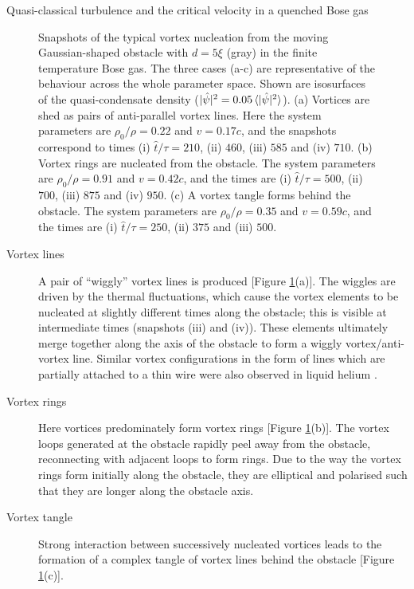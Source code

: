 \begin{chapter}{\label{cha:nonequib}Quasi-classical turbulence and the critical velocity in a quenched Bose gas}
\begin{figure}
    \caption{\label{fig:vort-lines} Snapshots of the typical vortex nucleation from the moving Gaussian-shaped obstacle with $d=5\xi$ (gray) in the finite temperature Bose gas. The three cases (a-c) are representative of the behaviour across the whole parameter space. Shown are  isosurfaces of the quasi-condensate density ($|\hat{\psi}|^2 = 0.05\braket{|\hat{\psi}|^2}$).  (a) Vortices are shed as pairs of anti-parallel vortex lines.  Here the system parameters are $\rho_0/\rho = 0.22$ and $v=0.17c$, and the snapshots correspond to times (i) $\hat{t}/\tau=210$, (ii) $460$, (iii) $585$ and (iv) $710$.  (b) Vortex rings are nucleated from the obstacle.  The system parameters are $\rho_0/\rho = 0.91$ and $v=0.42c$, and the times are (i) $\hat{t}/\tau=500$, (ii) $700$, (iii) $875$ and (iv) $950$. (c) A vortex tangle forms behind the obstacle. The system parameters are $\rho_0/\rho = 0.35$ and $v=0.59c$, and the times are (i) $\hat{t}/\tau=250$, (ii) $375$ and (iii) $500$. }
\end{figure}


\begin{description}
\item[Vortex lines] A pair of ``wiggly'' vortex lines is produced  [Figure  \ref{fig:vort-lines}(a)].  The wiggles are driven by the thermal fluctuations, which cause the vortex elements to be nucleated at slightly different times along the obstacle; this is visible at intermediate times (snapshots (iii) and (iv)).   These elements ultimately merge together along the axis of the obstacle to form a wiggly vortex/anti-vortex line. Similar vortex configurations
in the form of lines which are partially attached to a thin wire 
were also observed in liquid helium \cite{zieve2001}. 
\item[Vortex rings]  Here vortices predominately form vortex
rings [Figure \ref{fig:vort-lines}(b)].  The vortex loops generated
at the obstacle rapidly peel away from the obstacle, reconnecting with
adjacent loops to form rings. Due to the way the vortex rings form initially along the obstacle, they are elliptical and polarised such that they are longer along the obstacle axis. 
\item[Vortex tangle]  Strong
interaction between successively nucleated vortices leads to the formation of a complex tangle of vortex lines behind the obstacle [Figure \ref{fig:vort-lines}(c)].
\end{description}


\end{chapter}
